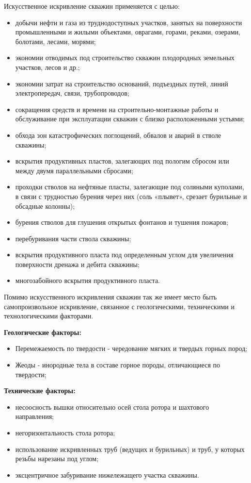 Искусственное искривление скважин применяется с целью:
\begin{itemize}
  \item добычи нефти и газа из труднодоступных участков, занятых на поверхности промышленными и жилыми объектами, оврагами, горами, реками, озерами, болотами, лесами, морями;
  \item экономии отводимых под строительство скважин плодородных земельных участков, лесов и др.;
  \item экономии затрат на строительство оснований, подъездных путей, линий электропередач, связи, трубопроводов;
  \item сокращения средств и времени на строительно-монтажные работы и обслуживание при эксплуатации скважин с близко расположенными устьями;
  \item обхода зон катастрофических поглощений, обвалов и аварий в стволе скважины;
  \item вскрытия продуктивных пластов, залегающих под пологим сбросом или между двумя параллельными сбросами;
  \item проходки стволов на нефтяные пласты, залегающие под соляными куполами, в связи с трудностью бурения через них (соль «плывет», срезает бурильные и обсадные колонны);
  \item бурения стволов для глушения открытых фонтанов и тушения пожаров;
  \item перебуривания части ствола скважины;
  \item вскрытия продуктивного пласта под определенным углом для увеличения поверхности дренажа и дебита скважины;
  \item многозабойного вскрытия продуктивного пласта.
\end{itemize}

Помимо искусственного искривления скважин так же имеет место быть самопроизвольное искривление, связанное с геологическими, техническими и технологическими факторами.

\textbf{Геологические факторы:}
\begin{itemize}
  \item Перемежаемость по твердости - чередование мягких и твердых горных пород;
  \item Жеоды - инородные тела в составе горное породы, отличающиеся по твердости;
\end{itemize}

\textbf{Технические факторы:}
\begin{itemize}
  \item несоосность вышки  относительно осей стола ротора  и шахтового направления;
  \item негоризонтальность стола ротора;
  \item использование искривленных труб (ведущих и бурильных) и труб, у которых резьбы нарезаны под углом;
  \item эксцентричное забуривание нижележащего участка скважины.
\end{itemize}

